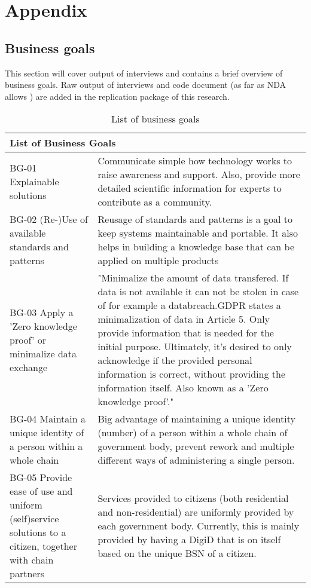
\chapter*{Appendix} %

\section*{Business goals}
This section will cover output of interviews and contains a brief overview of business goals. Raw output of interviews and code document (as far as NDA allows ) are added in the replication package of this research.
\begin{table}
\begin{tabular}{ |p{5cm}||p{11cm}|}
 \hline
 \multicolumn{2}{|l|}{List of Business Goals} \\
 \hline
 BG-01 Explainable solutions   &   Communicate simple how technology works to raise awareness and support. Also, provide more detailed scientific information for experts to contribute as a community.     \\
 \hline
 BG-02 (Re-)Use of available standards and patterns &  Reusage of standards and patterns is a goal to keep systems maintainable and portable. It also helps in building a knowledge base that can be applied on multiple products \\
  \hline
 BG-03 Apply a 'Zero knowledge proof' or minimalize data exchange & "Minimalize the amount of data transfered. If data is not available it can not be stolen in case of for example a databreach.GDPR states a minimalization of data in Article 5. Only provide information that is needed for the initial purpose.
Ultimately, it's desired to only acknowledge if the provided personal information is correct, without providing the information itself. Also known as a 'Zero knowledge proof'."  \\
  \hline
BG-04 Maintain a unique identity of a person within a whole chain & Big advantage of maintaining a unique identity (number) of a person within a whole chain of government body, prevent rework and multiple different ways of administering a single person.  \\
  \hline
 BG-05 Provide ease of use and uniform (self)service solutions to a citizen, together with chain partners &  Services provided to citizens (both residential and non-residential) are uniformly provided by each government body. Currently, this is mainly provided by having a DigiD that is on itself based on the unique BSN of a citizen.\\
   \hline
\end{tabular}
\caption{List of business goals}
\label{table:2}
\end{table}


